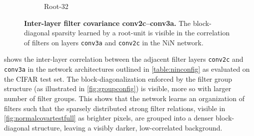 \documentclass[thesis]{subfiles}
\begin{document}
\begin{figure}[p]
\begin{subfigure}[b]{0.3\textheight}
				\caption{Root-32}\label{fig:root32corrfull}
			\end{subfigure}
			\caption[Inter-layer filter covariance conv2c--conv3a]{\textbf{Inter-layer filter covariance conv2c--conv3a.} The block-diagonal sparsity learned by a root-unit is visible in the correlation of filters on layers \texttt{conv3a} and \texttt{conv2c} in the NiN network.}\label{fig:covar}
		\end{figure}
	
	 shows the inter-layer correlation between the adjacent filter layers \texttt{conv2c} and \texttt{conv3a} in the network architectures outlined in \cref{table:ninconfig} as evaluated on the CIFAR test set. The block-diagonalization enforced by the filter group structure (as illustrated in \cref{fig:groupconfig}) is visible, more so with larger number of filter groups. This shows that the network learns an organization of filters such that the sparsely distributed strong filter relations, visible in \cref{fig:normalcovartestfull} as brighter pixels, are grouped into a denser block-diagonal structure, leaving a visibly darker, low-correlated background.
	
\end{document}
